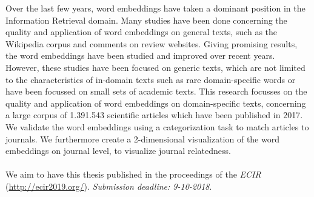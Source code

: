 \documentclass[../../Thesis.tex]{subfiles}
\begin{document}
Over the last few years, word embeddings have taken a dominant position in the Information Retrieval domain. Many studies have been done concerning the quality and application of word embeddings on general texts, such as the Wikipedia corpus and comments on review websites. Giving promising results, the word embeddings have been studied and improved over recent years. However, these studies have been focused on generic texts, which are not limited to the characteristics of in-domain texts such as rare domain-specific words or have been focussed on small sets of academic texts. This research focusses on the quality and application of word embeddings on domain-specific texts, concerning a large corpus of 1.391.543 scientific articles which have been published in 2017. We validate the word embeddings using a categorization task to match articles to journals. We furthermore create a 2-dimensional visualization of the word embeddings on journal level, to visualize journal relatedness.\\
\vspace*{\fill}
\\
We aim to have this thesis published in the proceedings of the \textit{ECIR} (\url{http://ecir2019.org/}). \textit{Submission deadline: 9-10-2018}.
\end{document}
